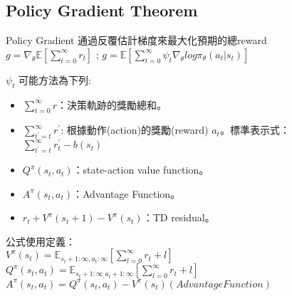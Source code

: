 \subsection{Policy Gradient Theorem}
Policy Gradient 通過反覆估計梯度來最大化預期的總reward\\[5pt]
$g = \nabla_\theta\mathbb{E}[\sum_{t=0}^\infty r_t]$ ; $g = \mathbb{E}[\sum_{t=0}^\infty\psi_t\nabla_\theta log\pi_\theta(a_t \vert s_t)]$\\[5pt]
\begin{Large}{$\psi_t$ 可能方法為下列:}\end{Large}
\begin{itemize}
\item $\sum_{t=0}^\infty r$：決策軌跡的獎勵總和。
\item $\sum_{t^{'}=t}^\infty r^{'}$: 根據動作(action)的獎勵(reward) $a_t$。標準表示式：$\sum_{t^{'}=t}^\infty r_t^{'}-b(s_t)$
\item $Q^\pi(s_t,a_t)$：state-action value function。
\item $A^\pi(s_t,a_t)$：Advantage Function。
\item $r_t+V^\pi(s_t+1)-V^\pi(s_t)$：TD residual。
\end{itemize}
公式使用定義：\\[5pt]
$V^\pi(s_t) = \mathbb{E}_{s_{t}+1:\infty,a_{t}:\infty}[\sum_{l=0}^\infty r_t+l]$\\[5pt]
$Q^\pi(s_t,a_t) = \mathbb{E}_{s_{t}+1:\infty_,a_{t}+1:\infty}[\sum_{l=0}^\infty r_t+l]$\\[5pt]
$A^\pi(s_t,a_t) = Q^\pi(s_t,a_t)-V^\pi(s_t)(Advantage Function)$\\[5pt]
